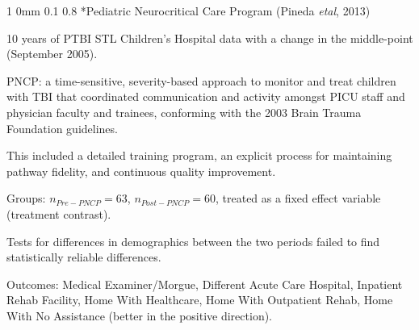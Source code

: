 \documentclass[12pt]{article}
\makeatletter
\newcommand{\9}{\\[9pt]}
\newcommand{\bgm}{\color{MyMath}}
\newcommand{\egm}{\color{white}}
\renewcommand{\section}{\@startsection
	    {section}%
	    {1}%
	    {0mm}%
	    {0.1\baselineskip}%
	    {0.8\baselineskip}%
	    {\newpage \color[cmyk]{0.43,0,0.01,0} \center\LARGE}}%
\makeatother
\begin{document}
\begin{landscape}
\begin{Large}
{\section*{Pediatric Neurocritical Care Program (Pineda \emph{etal}, 2013)}
\begin{ohlist}
    \item   10 years of PTBI STL Children's Hospital data with a change in the middle-point (September 2005).
    \item   PNCP: a time-sensitive, severity-based approach to monitor and treat children with TBI that coordinated communication 
            and activity amongst PICU staff and physician faculty and trainees, conforming with the 2003 Brain Trauma Foundation
            guidelines.
    \item   This included a detailed training program, an explicit process for maintaining pathway fidelity, and continuous 
            quality improvement. 
    \item   Groups: \bgm$n_{Pre-PNCP}=63$\egm, \bgm$n_{Post-PNCP}=60$\egm, treated as a fixed effect variable (treatment contrast).
    \item   Tests for differences in demographics between the two periods failed to find statistically reliable differences.
    \item   Outcomes: Medical Examiner/Morgue, Different Acute Care Hospital, Inpatient Rehab Facility, Home With Healthcare,
            Home With Outpatient Rehab, Home With No Assistance (better in the positive direction).
\end{ohlist}

}
\end{Large}
\end{landscape}
\end{document}
